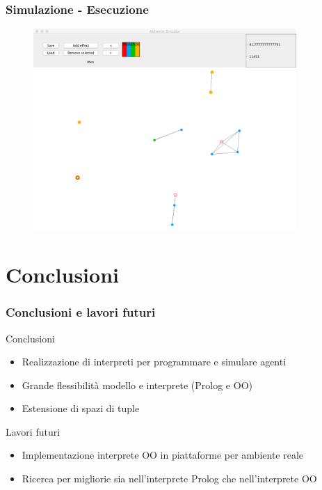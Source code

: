 \documentclass[handout]{beamer}\mode<presentation>{\usetheme{AMSCesenaBleu}}
\begin{document}

\begin{frame}
\frametitle{Simulazione - Esecuzione}
\vspace*{-0.25cm}
\begin{figure}
\includegraphics[width=10cm]{images/simul_harvest2.png}
\end{figure}
\end{frame}


\section{Conclusioni}

\begin{frame}
\frametitle{Conclusioni e lavori futuri}
\begin{block}{Conclusioni}
\begin{itemize}
\item Realizzazione di interpreti per programmare e simulare agenti
\item Grande flessibilità modello e interprete (Prolog e OO)
\item Estensione di spazi di tuple 
\end{itemize}
\end{block}
\begin{block}{Lavori futuri}
\begin{itemize}
\item Implementazione interprete OO in piattaforme per ambiente reale
\item Ricerca per migliorie sia nell'interprete Prolog che nell'interprete OO
\end{itemize}
\end{block}
\end{frame}

\section{}
\subsection{}
\maketitle
\end{document}
